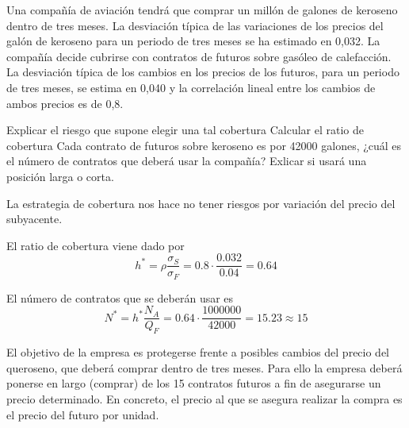 \begin{problem}[4]
Una compañía de aviación tendrá que comprar un millón de galones de keroseno dentro de tres
meses. La desviación típica de las variaciones de los precios del galón de keroseno para un periodo
de tres meses se ha estimado en 0,032. La compañía decide cubrirse con contratos de futuros sobre
gasóleo de calefacción. La desviación típica de los cambios en los precios de los futuros, para un
periodo de tres meses, se estima en 0,040 y la correlación lineal entre los cambios de ambos precios
es de 0,8.

\ppart Explicar el riesgo que supone elegir una tal cobertura
\ppart Calcular el ratio de cobertura
\ppart Cada contrato de futuros sobre keroseno es por 42000 galones, ¿cuál es el número de contratos que deberá usar la compañía? Exlicar si usará una posición larga o corta.
\solution


\spart

La estrategia de cobertura nos hace no tener riesgos por variación del precio del subyacente.

\spart

El ratio de cobertura viene dado por
\[h^* = ρ \frac{σ_S}{σ_F} = 0.8 \cdot \frac{0.032}{0.04} = 0.64\]

\spart

El número de contratos que se deberán usar es
\[N^* = h^* \frac{N_A}{Q_F} = 0.64 \cdot \frac{1000000}{42000} = 15.23 \approx 15\]

El objetivo de la empresa es protegerse frente a posibles cambios del precio del queroseno, que deberá comprar dentro de tres meses. Para ello la empresa deberá
ponerse en largo (comprar) de los 15 contratos futuros a fin de asegurarse un precio determinado. En concreto, el precio al que se asegura realizar la compra es el precio del futuro por unidad.

\end{problem}

